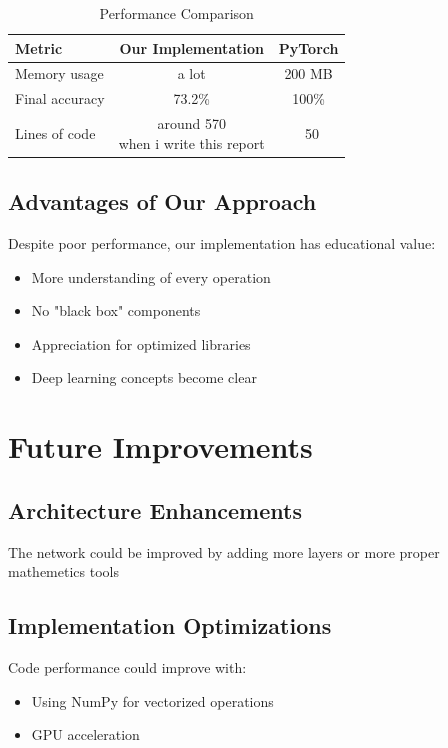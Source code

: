 \documentclass[conference]{IEEEtran}
\begin{document}
\begin{table}[htbp]
\caption{Performance Comparison}
\label{tab:comparison}
\centering
\begin{tabular}{|l|c|c|}
\hline
\textbf{Metric} & \textbf{Our Implementation} & \textbf{PyTorch} \\
\hline
Memory usage & a lot & 200 MB \\
Final accuracy & 73.2\% & 100\% \\
Lines of code & \makecell{around 570 \\ when i write this report} & ~50 \\
\hline
\end{tabular}
\end{table}

\subsection{Advantages of Our Approach}
Despite poor performance, our implementation has educational value:
\begin{itemize}
    \item More understanding of every operation
    \item No "black box" components
    \item Appreciation for optimized libraries
    \item Deep learning concepts become clear
\end{itemize}

\section{Future Improvements}

\subsection{Architecture Enhancements}
The network could be improved by adding more layers or more proper mathemetics tools

\subsection{Implementation Optimizations}
Code performance could improve with:
\begin{itemize}
    \item Using NumPy for vectorized operations
    \item GPU acceleration
\end{itemize}
\end{document}
